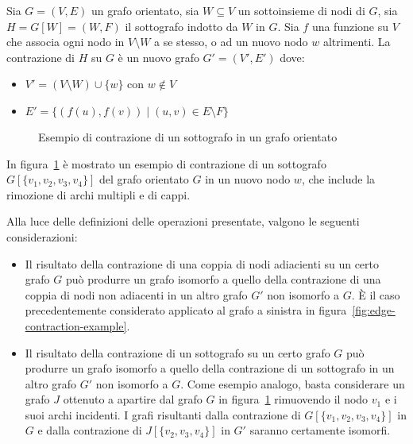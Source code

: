 \begin{definition}
    Sia $G = (V, E)$ un grafo orientato, sia $W \subseteq V$ un sottoinsieme di nodi di $G$, sia $H = G[W] = (W, F)$
    il sottografo indotto da $W$ in $G$.
    Sia $f$ una funzione su $V$ che associa ogni nodo in $V \setminus W$ a se stesso, o ad un nuovo nodo $w$
    altrimenti.
    La contrazione di $H$ su $G$ \`e un nuovo grafo $G' = (V', E')$ dove:
    \begin{itemize}
        \item $V' = (V \setminus W) \cup \{w\}$ con $w \notin V$
        \item $E' = \{(f(u), f(v)) \mid (u, v) \in E \setminus F\}$
    \end{itemize}
\end{definition}

\begin{figure}[h]
    \centering
    
    \caption{Esempio di contrazione di un sottografo in un grafo orientato}
    \label{fig:subgraph-contraction-example}
\end{figure}

In figura~\ref{fig:subgraph-contraction-example} \`e mostrato un esempio di contrazione di un sottografo
$G[\{v_1, v_2, v_3, v_4\}]$ del grafo orientato $G$ in un nuovo nodo $w$, che include la rimozione di archi multipli
e di cappi. \newline

Alla luce delle definizioni delle operazioni presentate, valgono le seguenti considerazioni:
\begin{itemize}
    \item Il risultato della contrazione di una coppia di nodi adiacienti su un certo grafo $G$ pu\`o produrre un
    grafo isomorfo a quello della contrazione di una coppia di nodi non adiacenti in un altro grafo $G'$ non isomorfo
    a $G$.
    \`E il caso precedentemente considerato applicato al grafo a sinistra in figura~\ref{fig:edge-contraction-example}.
    \item Il risultato della contrazione di un sottografo su un certo grafo $G$ pu\`o produrre un grafo isomorfo
    a quello della contrazione di un sottografo in un altro grafo $G'$ non isomorfo a $G$.
    Come esempio analogo, basta considerare un grafo $J$ ottenuto a apartire dal grafo $G$ in
    figura~\ref{fig:subgraph-contraction-example} rimuovendo il nodo $v_1$ e i suoi archi incidenti.
    I grafi risultanti dalla contrazione di $G[\{v_1, v_2, v_3, v_4\}]$ in $G$ e dalla contrazione di
    $J[\{v_2, v_3, v_4\}]$ in $G'$ saranno certamente isomorfi.
\end{itemize}

